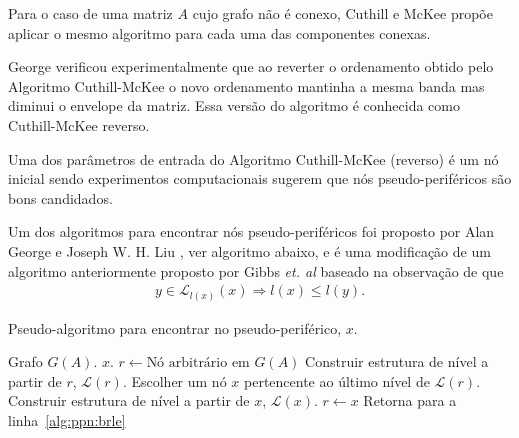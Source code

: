 Para o caso de uma matriz $A$ cujo grafo não é conexo, Cuthill e McKee propõe
aplicar o mesmo algoritmo para cada uma das componentes conexas.

George \cite{George:1971:ComputerImplementation} verificou
experimentalmente que ao reverter o ordenamento obtido pelo Algoritmo
Cuthill-McKee o novo ordenamento mantinha a mesma banda mas diminui o
envelope da matriz. Essa versão do algoritmo é conhecida como Cuthill-McKee
reverso.

Uma dos parâmetros de entrada do Algoritmo Cuthill-McKee (reverso) é um nó inicial sendo
experimentos computacionais \cite{Cuthill:1969:ReducingBandwidth} sugerem que
nós pseudo-periféricos são bons candidados.

Um dos algoritmos para encontrar nós pseudo-periféricos foi proposto por Alan
George e Joseph W. H. Liu \cite{George:1979:NodeFinder}, ver algoritmo
abaixo, e é uma
modificação de um algoritmo anteriormente proposto por Gibbs \textit{et. al}
\cite{Gibbs:1976:ReducingBandwidth} baseado na observação de que
\begin{align*}
    y \in \mathcal{L}_{l(x)}(x) \Longrightarrow l(x) \leq l(y).
\end{align*}
\begin{algorithm}[H]
    \caption{Pseudo-algoritmo para encontrar no pseudo-periférico, $x$.}
    \label{alg:ppn}
    \begin{algorithmic}[1]
        \REQUIRE Grafo $G(A)$.
        \ENSURE $x$.
        \STATE $r \longleftarrow \text{Nó arbitrário em }G(A)$
        \STATE Construir estrutura de nível a partir de $r$, $\mathcal{L}(r)$.
        \label{alg:ppn:brle}
        \STATE Escolher um nó $x$ pertencente ao último nível de
        $\mathcal{L}(r)$.
        \STATE Construir estrutura de nível a partir de $x$, $\mathcal{L}(x)$.
            \STATE $r \longleftarrow x$
            \STATE Retorna para a linha~\ref{alg:ppn:brle}
        \ENDIF
    \end{algorithmic}
\end{algorithm}
